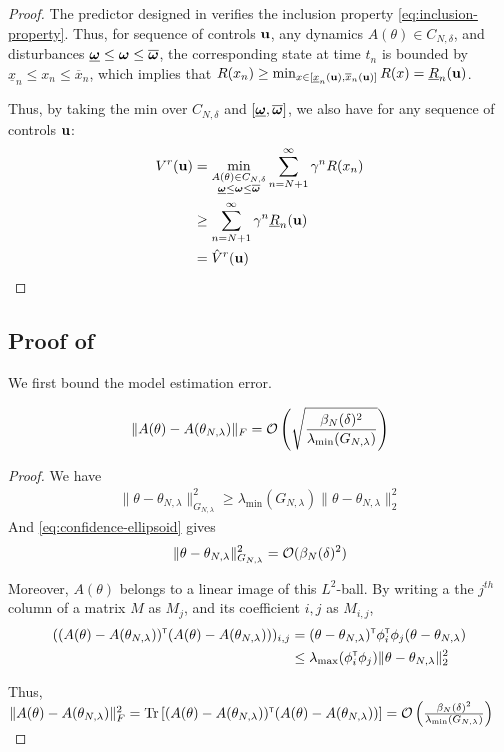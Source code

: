 \documentclass{article}
\begin{document}
\begin{proof}
	The predictor designed in  verifies the inclusion property \eqref{eq:inclusion-property}. Thus, for sequence of controls $\mathbf{u}$, any dynamics $A(\theta)\in C_{N,\delta}$, and disturbances $\underline{\bm{\omega}} \leq \bm{\omega} \leq \overline{\bm{\omega}}$, the corresponding state at time $t_n$ is bounded by $\underline{x}_n \leq x_n \leq \overline{x}_n$, which implies that $R(x_n) \geq \min_{x\in[\underline{x}_n(\mathbf{u}), \overline{x}_n(\mathbf{u})]}  R(x) = \underline{R}_n(\mathbf{u})$.
	
	Thus, by taking the min over $C_{N,\delta}$ and $[\underline{\bm{\omega}}, \overline{\bm{\omega}}]$, we also have for any sequence of controls $\mathbf{u}$:
	\begin{align*}
	    V^r(\mathbf{u}) &= \min_{\substack{A(\theta)\in C_{N,\delta}\\ \underline{\bm{\omega}} \leq \bm{\omega} \leq \overline{\bm{\omega}}}} \sum_{n=N+1}^\infty \gamma^n R(x_n)\\
	    &\geq \sum_{n=N+1}^\infty \gamma^n \underline{R}_n(\mathbf{u})\\
	    &= \hat{V}^r(\mathbf{u})
	\end{align*}
\end{proof}

\subsection{Proof of }
\label{sec:proof-minimax-regret-bound}
We first bound the model estimation error.
\begin{lemma}
	\label{lem:dynamics-est-bound}
		\[\|A(\theta) - A(\theta_{N,\lambda})\|_F = \mathcal{O}\left(\sqrt{ {\frac{\beta_N(\delta)^2}{\lambda_{\min}(G_{N,\lambda})}}}\right) \]
\end{lemma}
\begin{proof}
	We have 
	\begin{align*}
	\|\theta - \theta_{N,\lambda}\|_{G_{N,\lambda}}^2 \geq \lambda_{\min}(G_{N,\lambda})\|\theta - \theta_{N,\lambda}\|_{2}^2
	\end{align*}
	And \eqref{eq:confidence-ellipsoid} gives
	\[\|\theta - \theta_{N,\lambda}\|_{G_{N,\lambda}}^2 = \mathcal{O}(\beta_N(\delta)^2) \]
	
	Moreover, $A(\theta)$ belongs to a linear image of this $L^2$-ball. By writing a the $j^{th}$ column of a matrix $M$ as $M_j$, and its coefficient $i,j$ as $M_{i,j}$,
	\begin{align*}
	((A(\theta)-A(\theta_{N,\lambda}))^{\mathsf{\scriptscriptstyle T}} (A(\theta) - A(\theta_{N,\lambda})))_{i,j}
	&= (\theta-\theta_{N,\lambda})^{\mathsf{\scriptscriptstyle T}}\phi_{i}^{\mathsf{\scriptscriptstyle T}}\phi_j(\theta-\theta_{N,\lambda}) \\
	&\leq \lambda_{\max}(\phi_{i}^{\mathsf{\scriptscriptstyle T}}\phi_j) \|\theta - \theta_{N,\lambda}\|_{2}^2
	\end{align*}
	
	Thus, $\|A(\theta) - A(\theta_{N,\lambda})\|_F^2 = \operatorname{Tr}{\left[(A(\theta)-A(\theta_{N,\lambda}))^{\mathsf{\scriptscriptstyle T}} (A(\theta) - A(\theta_{N,\lambda}))\right]} = \mathcal{O}\left( {\frac{\beta_N(\delta)^2}{\lambda_{\min}(G_{N,\lambda})}}\right) $
	
\end{proof}
\end{document}

